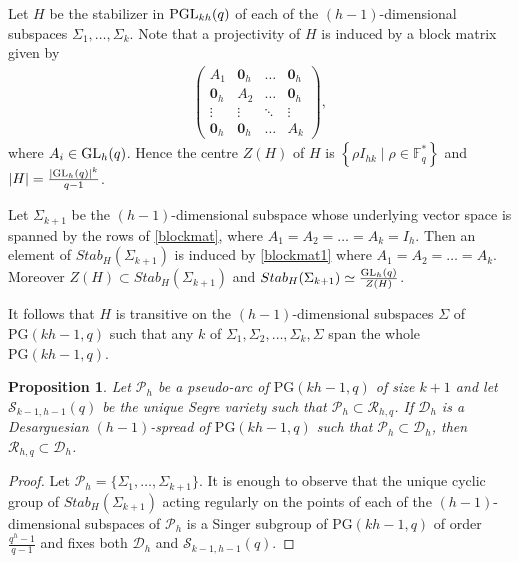 \documentclass[11pt]{article}
\newtheorem{prop}[theorem]{Proposition}
\theoremstyle{definition}
\numberwithin{equation}{section}
\def\0{\mathbf 0}
\def\cP{\mathcal P}
\def\cD{\mathcal D}
\def\cR{\mathcal R}
\def\cS{\mathcal S}
\def\PG{\mathrm{PG}}
\def\F{{\mathbb F}}
\def\PGL{{\rm PGL}}
\def\GL{{\rm GL}}
\begin{document}
Let $H$ be the stabilizer in $\PGL_{kh}(q)$ of each of the $(h-1)$-dimensional subspaces $\Sigma_1, \dots, \Sigma_k$. Note that a projectivity of $H$ is induced by a block matrix given by 
\begin{align}
\begin{pmatrix}
A_1 & \0_h & \dots & \0_h \\
\0_h & A_2 & \dots & \0_h \\
\vdots & \vdots & \ddots & \vdots \\
\0_h & \0_h & \dots & A_k
\end{pmatrix},  \label{blockmat1}
\end{align}
where $A_i \in \GL_h(q)$. Hence the centre $Z(H)$ of $H$ is $\left\{\rho I_{hk} \mid \rho \in \F_q^*\right\}$ and 
$
|H| = \frac{|\GL_h(q)|^k}{q-1}$.

Let $\Sigma_{k+1}$ be the $(h-1)$-dimensional subspace whose underlying vector space is spanned by the rows of \eqref{blockmat}, where $A_1 = A_2 = \ldots = A_k = I_h$. Then an element of $Stab_H(\Sigma_{k+1})$ is induced by \eqref{blockmat1} where $A_1 = A_2 = \ldots = A_k$. Moreover $Z(H) \subset Stab_H(\Sigma_{k+1})$ and 
$
Stab_H(\Sigma_{k+1}) \simeq \frac{\GL_h(q)}{Z(H)}$.

It follows that $H$ is transitive on the $(h-1)$-dimensional subspaces $\Sigma$ of $\PG(kh-1, q)$ such that any $k$ of $\Sigma_1, \Sigma_2, \dots, \Sigma_k, \Sigma$ span the whole $\PG(kh-1, q)$.

\begin{prop}\label{prop:segre}
Let $\cP_h$ be a pseudo-arc of $\PG(kh-1, q)$ of size $k+1$ and let $\cS_{k-1, h-1}(q)$ be the unique Segre variety such that $\cP_{h} \subset \cR_{h, q}$. If $\cD_h$ is a Desarguesian $(h-1)$-spread of $\PG(kh-1, q)$ such that $\cP_h \subset \cD_h$, then $\cR_{h, q} \subset \cD_h$.  
\end{prop}
\begin{proof}
Let $\cP_h = \{\Sigma_1, \dots, \Sigma_{k+1}\}$. It is enough to observe that the unique cyclic group of $Stab_H(\Sigma_{k+1})$ acting regularly on the points of each of the $(h-1)$-dimensional subspaces of $\cP_h$ is a Singer subgroup of $\PG(kh - 1, q)$ of order $\frac{q^h-1}{q-1}$ and fixes both $\cD_h$ and $\cS_{k-1, h-1}(q)$.  
\end{proof}
\end{document}
